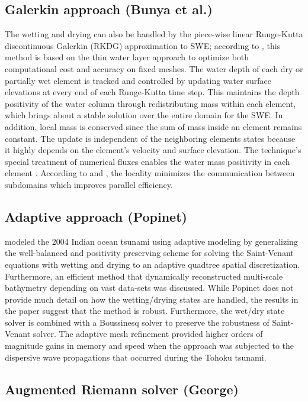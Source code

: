\documentclass[10pt,a4paper]{article}
\begin{document}
	\subsection{Galerkin approach (Bunya et al.)}  
	The wetting and drying can also be handled by the piece-wise linear Runge-Kutta discontinuous Galerkin (RKDG)  approximation  to SWE;  according to   \citet{bu-ku-we-da:2009}, this method is based on the thin water layer approach to optimize both computational cost and accuracy on fixed meshes. The water depth of each dry or partially wet element is tracked and controlled by updating water surface elevations at every end of each Runge-Kutta time step. This maintains the depth positivity of the water column through redistributing mass within each element, which brings about a stable solution over the entire domain for the SWE. In addition, local mass is conserved since the sum of mass inside an element remains constant. The update is independent of the neighboring elements states because it highly depends on the element's velocity and surface elevation. The technique's special treatment of numerical fluxes enables the water mass positivity in each element  \citep{bu-ku-we-da:2009,kubatko2007semi}. According to   \citet{bokhove2005flooding} and \citet{bu-ku-we-da:2009}, the locality minimizes the communication between subdomains which improves parallel efficiency. 
	
	\subsection{Adaptive approach (Popinet)}
	  \citet{popinet2011quadtree} modeled the 2004 Indian ocean tsunami using adaptive modeling by generalizing the   \citet{audusse2004fast} well-balanced and positivity preserving scheme for solving the Saint-Venant equations with wetting and drying to an adaptive quadtree spatial discretization.  Furthermore, an efficient method that dynamically reconstructed multi-scale bathymetry depending on vast data-sets was discussed.  While Popinet does not provide much detail on how the wetting/drying states are handled, the results in the paper suggest that the method is robust.  Furthermore, the wet/dry state solver is combined with a Boussinesq solver to preserve the robustness of Saint-Venant solver. The adaptive mesh refinement provided higher orders of magnitude gains in memory and speed when the approach was subjected to the dispersive wave propagations that occurred during the Tohoku tsunami.
	
	
	\subsection{Augmented Riemann solver (George)}
	
\end{document}
